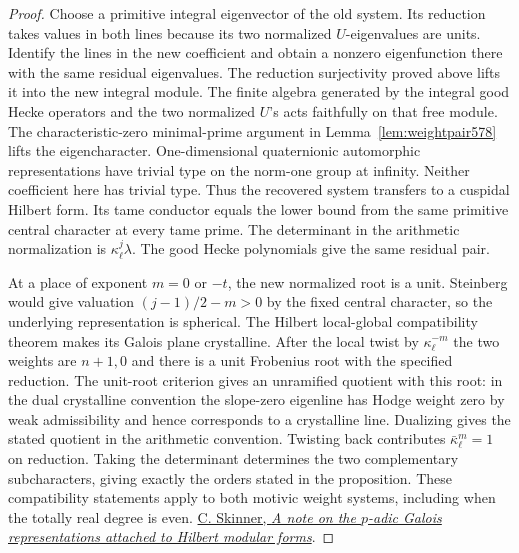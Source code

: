 \documentclass[a4paper,11pt]{article}
\theoremstyle{definition}
\theoremstyle{remark}
\numberwithin{equation}{section}
\begin{document}
\begin{proof}
Choose a primitive integral eigenvector of the old system.
Its reduction takes values in both lines because its two
normalized \(U\)-eigenvalues are units. Identify the lines
in the new coefficient and obtain a nonzero eigenfunction
there with the same residual eigenvalues. The reduction
surjectivity proved above lifts it into the new integral
module. The finite algebra generated by the integral good
Hecke operators and the two normalized \(U\)'s acts faithfully
on that free module. The characteristic-zero minimal-prime
argument in Lemma~\ref{lem:weightpair578} lifts the
eigencharacter. One-dimensional quaternionic automorphic
representations have trivial type on the norm-one group at
infinity. Neither coefficient here has trivial type. Thus
the recovered system transfers to a cuspidal Hilbert form.
Its tame conductor equals the lower bound from the same
primitive central character at every tame prime. The determinant
in the arithmetic normalization is \(\kappa_\ell^j\lambda\).
The good Hecke polynomials give the same residual pair.

At a place of exponent \(m=0\) or \(-t\), the new normalized
root is a unit. Steinberg would give valuation
\((j-1)/2-m>0\) by the fixed central character, so the
underlying representation is spherical. The Hilbert
local-global compatibility theorem makes its Galois plane
crystalline. After the local twist by \(\kappa_\ell^{-m}\)
the two weights are \(n+1,0\) and there is a unit Frobenius
root with the specified reduction. The unit-root criterion
gives an unramified quotient with this root: in the dual
crystalline convention the slope-zero eigenline has Hodge
weight zero by weak admissibility and hence corresponds to
a crystalline line. Dualizing gives the stated quotient in
the arithmetic convention. Twisting back contributes
\(\bar\kappa_\ell^m=1\) on reduction. Taking the determinant
determines the two complementary subcharacters, giving
exactly the orders stated in the proposition. These
compatibility statements apply to both motivic weight
systems, including when the totally real degree is even.
\href{https://ems.press/content/serial-article-files/26055}
{C. Skinner, \emph{A note on the \(p\)-adic Galois representations
attached to Hilbert modular forms}}.
\end{proof}
\end{document}
